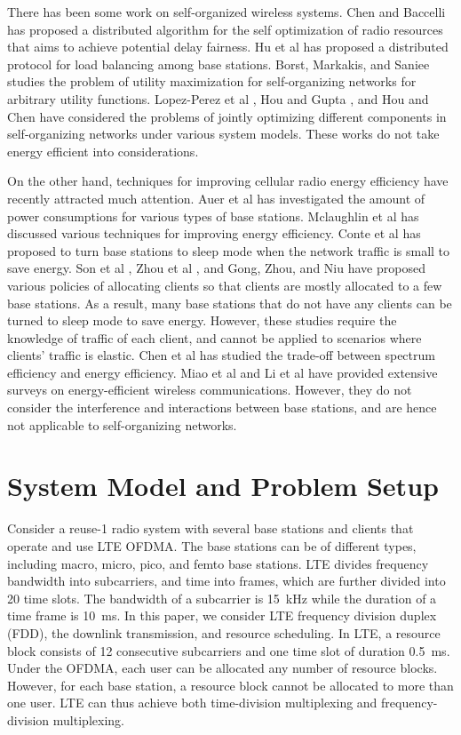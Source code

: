 \documentclass[conference]{IEEEtran}
\begin{document}
There has been some work on self-organized wireless systems. Chen and Baccelli \cite{CSChen10} has proposed a distributed algorithm for the self optimization of radio resources that aims to achieve potential delay fairness. Hu et al \cite{HH10} has proposed a distributed protocol for load balancing among base stations. Borst, Markakis, and Saniee \cite{Sem11} studies the problem of utility maximization for self-organizing networks for arbitrary utility functions. Lopez-Perez et al \cite{DLP11}, Hou and Gupta \cite{Hou11}, and Hou and Chen \cite{Hou12} have considered the problems of jointly optimizing different components in self-organizing networks under various system models. These works do not take energy efficient into considerations.

On the other hand, techniques for
improving cellular radio energy efficiency have recently attracted much attention. Auer et al \cite{Auer11} has investigated the amount of power consumptions for various types of base stations. Mclaughlin et al \cite{greenBS11} has discussed various techniques for improving energy efficiency. Conte et al \cite{Conte11} has proposed to turn base stations to sleep mode when the network traffic is small to save energy. Son et al \cite{kson11}, Zhou et al \cite{SZ09}, and Gong, Zhou, and Niu \cite{JG12} have proposed various policies of allocating clients so that clients are mostly allocated to a few base stations. As a result, many base stations that do not have any clients can be turned to sleep mode to save energy. However, these studies require the knowledge of traffic of each client, and cannot be applied to scenarios where clients' traffic is elastic. Chen et al \cite{YC11} has studied the trade-off between spectrum efficiency and energy efficiency. Miao et al \cite{GM09} and Li et al \cite{survey11} have provided extensive surveys on energy-efficient wireless communications. However, they do not consider the interference and interactions between base stations, and are hence not applicable to self-organizing networks.


\section{System Model and Problem Setup}  \label{section:system_model}


Consider a reuse-1 radio system with several base stations and clients that operate and use LTE OFDMA. The base stations can be of different types, including macro, micro, pico, and femto base stations. LTE divides frequency bandwidth into subcarriers, and time into frames, which are further divided into 20 time slots. The bandwidth of a subcarrier is 15~kHz while the duration of a time frame is 10~ms. In this paper, we consider LTE frequency division duplex (FDD), the downlink transmission, and resource scheduling. In LTE, a resource block consists of 12 consecutive subcarriers and one time slot of duration 0.5~ms. Under the OFDMA, each user can be allocated any number of resource blocks. However, for each base station, a resource block cannot be allocated to more than one user. LTE can thus achieve both time-division multiplexing and frequency-division multiplexing.
\end{document}
